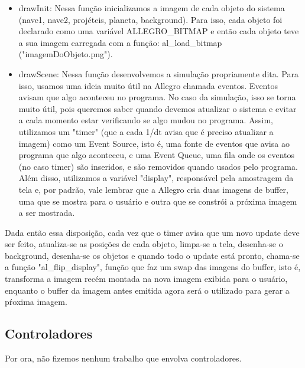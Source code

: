 \documentclass{article}
\begin{document}
\begin{itemize}
  \item drawInit: Nessa função inicializamos a imagem de cada objeto do sistema (nave1, nave2, projéteis, planeta, background). Para isso, cada objeto foi declarado como
uma variável ALLEGRO\_BITMAP e então cada objeto teve a sua imagem carregada com a função: al\_load\_bitmap ("imagemDoObjeto.png").

  \item drawScene: Nessa função desenvolvemos a simulação propriamente dita. Para isso, usamos uma ideia muito útil na Allegro chamada eventos. Eventos avisam
que algo aconteceu no programa. No caso da simulação, isso se torna muito útil, pois queremos saber quando devemos atualizar o sistema e evitar a cada momento
estar verificando se algo mudou no programa. Assim, utilizamos um "timer" (que a cada 1/dt avisa que é preciso atualizar a imagem) como um Event Source, isto é,
uma fonte de eventos que avisa ao programa que algo aconteceu, e uma Event Queue, uma fila onde os eventos (no caso timer) são inseridos, e são removidos quando usados
pelo programa. Além disso, utilizamos a variável "display", responsável pela amostragem da tela e, por padrão, vale lembrar que a Allegro cria duas imagens de buffer,
uma que se mostra para o usuário e outra que se constrói a próxima imagem a ser mostrada.
\end{itemize}
Dada então essa disposição, cada vez que o timer avisa que um novo update deve ser feito, atualiza-se as posições de cada objeto, limpa-se a tela, desenha-se o background,
desenha-se os objetos e quando todo o update está pronto, chama-se a função "al\_flip\_display", função que faz um swap das imagens do buffer, isto é, transforma a imagem
recém montada na nova imagem exibida para o usuário, enquanto o buffer da imagem antes emitida agora será o utilizado para gerar a pŕoxima imagem.

\subsection{Controladores}
Por ora, não fizemos nenhum trabalho que envolva controladores.
\end{document}
